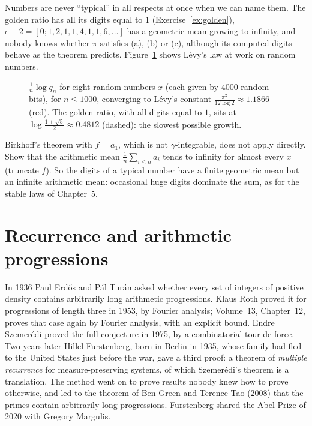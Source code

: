 Numbers are never ``typical'' in all respects at once when we can name them. The golden ratio has all its digits equal to $1$ (Exercise~\ref{ex:golden}), $e-2=[0;1,2,1,1,4,1,1,6,\dots]$ has a geometric mean growing to infinity, and
nobody knows whether $\pi$ satisfies (a), (b) or (c), although its computed digits behave as the theorem predicts. Figure~\ref{fig:levy} shows L\'evy's law at work on random numbers.

\begin{figure}[ht]
\centering{}
\caption{$\frac1n\log q_n$ for eight random numbers $x$ (each given by $4000$ random bits), for $n\le1000$, converging to L\'evy's constant $\frac{\pi^2}{12\log2}\approx1.1866$ (red). The golden ratio, with all digits equal to $1$, sits at $\log\frac{1+\sqrt5}2\approx0.4812$
(dashed): the slowest possible growth.}
\label{fig:levy}
\end{figure}

\begin{think}
Birkhoff's theorem with $f=a_1$, which is not $\gamma$-integrable, does not apply directly. Show that the arithmetic mean $\frac1n\sum_{i\le n}a_i$ tends to infinity for almost every $x$ (truncate $f$). So the
digits of a typical number have a finite geometric mean but an infinite arithmetic mean: occasional huge digits dominate the sum, as for the stable laws of Chapter~5.
\end{think}

\section{Recurrence and arithmetic progressions}

In 1936 Paul Erd\H{o}s and P\'al Tur\'an asked whether every set of integers of positive density contains arbitrarily long arithmetic progressions. Klaus Roth proved it for progressions of length three in 1953,
by Fourier analysis; Volume~13, Chapter~12, proves that case again by Fourier analysis, with an explicit bound. Endre Szemer\'edi proved the full conjecture in 1975, by a combinatorial tour de force. Two years later Hillel Furstenberg, born in Berlin in 1935, whose family had fled to the United
States just before the war, gave a third proof: a theorem of \emph{multiple recurrence} for measure-preserving systems, of which Szemer\'edi's theorem is a translation. The method went on to prove results nobody
knew how to prove otherwise, and led to the theorem of Ben Green and Terence Tao (2008) that the primes contain arbitrarily long progressions. Furstenberg shared the Abel Prize of 2020 with Gregory Margulis.

